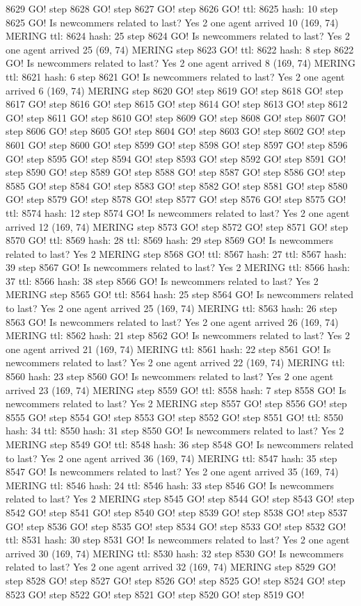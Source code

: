 8629 GO! step 8628 GO! step 8627 GO! step 8626 GO! ttl: 8625 hash: 10 step 8625 GO! Is newcommers related to last? Yes 2 one agent arrived 10 (169, 74) MERING ttl: 8624 hash: 25 step 8624 GO! Is newcommers related to last? Yes 2 one agent arrived 25 (69, 74) MERING step 8623 GO! ttl: 8622 hash: 8 step 8622 GO! Is newcommers related to last? Yes 2 one agent arrived 8 (169, 74) MERING ttl: 8621 hash: 6 step 8621 GO! Is newcommers related to last? Yes 2 one agent arrived 6 (169, 74) MERING step 8620 GO! step 8619 GO! step 8618 GO! step 8617 GO! step 8616 GO! step 8615 GO! step 8614 GO! step 8613 GO! step 8612 GO! step 8611 GO! step 8610 GO! step 8609 GO! step 8608 GO! step 8607 GO! step 8606 GO! step 8605 GO! step 8604 GO! step 8603 GO! step 8602 GO! step 8601 GO! step 8600 GO! step 8599 GO! step 8598 GO! step 8597 GO! step 8596 GO! step 8595 GO! step 8594 GO! step 8593 GO! step 8592 GO! step 8591 GO! step 8590 GO! step 8589 GO! step 8588 GO! step 8587 GO! step 8586 GO! step 8585 GO! step 8584 GO! step 8583 GO! step 8582 GO! step 8581 GO! step 8580 GO! step 8579 GO! step 8578 GO! step 8577 GO! step 8576 GO! step 8575 GO! ttl: 8574 hash: 12 step 8574 GO! Is newcommers related to last? Yes 2 one agent arrived 12 (169, 74) MERING step 8573 GO! step 8572 GO! step 8571 GO! step 8570 GO! ttl: 8569 hash: 28 ttl: 8569 hash: 29 step 8569 GO! Is newcommers related to last? Yes 2 MERING step 8568 GO! ttl: 8567 hash: 27 ttl: 8567 hash: 39 step 8567 GO! Is newcommers related to last? Yes 2 MERING ttl: 8566 hash: 37 ttl: 8566 hash: 38 step 8566 GO! Is newcommers related to last? Yes 2 MERING step 8565 GO! ttl: 8564 hash: 25 step 8564 GO! Is newcommers related to last? Yes 2 one agent arrived 25 (169, 74) MERING ttl: 8563 hash: 26 step 8563 GO! Is newcommers related to last? Yes 2 one agent arrived 26 (169, 74) MERING ttl: 8562 hash: 21 step 8562 GO! Is newcommers related to last? Yes 2 one agent arrived 21 (169, 74) MERING ttl: 8561 hash: 22 step 8561 GO! Is newcommers related to last? Yes 2 one agent arrived 22 (169, 74) MERING ttl: 8560 hash: 23 step 8560 GO! Is newcommers related to last? Yes 2 one agent arrived 23 (169, 74) MERING step 8559 GO! ttl: 8558 hash: 7 step 8558 GO! Is newcommers related to last? Yes 2 MERING step 8557 GO! step 8556 GO! step 8555 GO! step 8554 GO! step 8553 GO! step 8552 GO! step 8551 GO! ttl: 8550 hash: 34 ttl: 8550 hash: 31 step 8550 GO! Is newcommers related to last? Yes 2 MERING step 8549 GO! ttl: 8548 hash: 36 step 8548 GO! Is newcommers related to last? Yes 2 one agent arrived 36 (169, 74) MERING ttl: 8547 hash: 35 step 8547 GO! Is newcommers related to last? Yes 2 one agent arrived 35 (169, 74) MERING ttl: 8546 hash: 24 ttl: 8546 hash: 33 step 8546 GO! Is newcommers related to last? Yes 2 MERING step 8545 GO! step 8544 GO! step 8543 GO! step 8542 GO! step 8541 GO! step 8540 GO! step 8539 GO! step 8538 GO! step 8537 GO! step 8536 GO! step 8535 GO! step 8534 GO! step 8533 GO! step 8532 GO! ttl: 8531 hash: 30 step 8531 GO! Is newcommers related to last? Yes 2 one agent arrived 30 (169, 74) MERING ttl: 8530 hash: 32 step 8530 GO! Is newcommers related to last? Yes 2 one agent arrived 32 (169, 74) MERING step 8529 GO! step 8528 GO! step 8527 GO! step 8526 GO! step 8525 GO! step 8524 GO! step 8523 GO! step 8522 GO! step 8521 GO! step 8520 GO! step 8519 GO! 